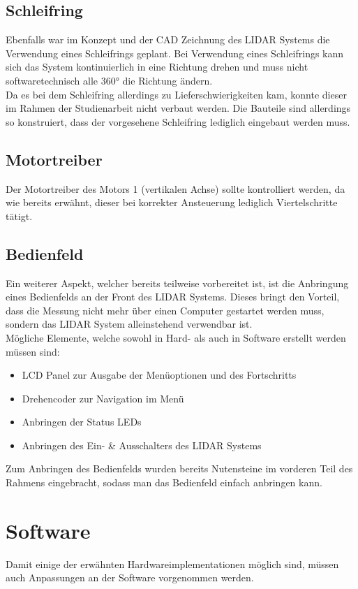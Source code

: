 \subsection{Schleifring}
Ebenfalls war im Konzept und der \ac{CAD} Zeichnung des \ac{LIDAR} Systems die Verwendung eines Schleifrings geplant. Bei Verwendung eines Schleifrings kann sich das System kontinuierlich in eine Richtung drehen und muss nicht softwaretechnisch alle 360° die Richtung ändern.\\
Da es bei dem Schleifring allerdings zu Lieferschwierigkeiten kam, konnte dieser im Rahmen der Studienarbeit nicht verbaut werden. Die Bauteile sind allerdings so konstruiert, dass der vorgesehene Schleifring lediglich eingebaut werden muss. 
\subsection{Motortreiber}
Der Motortreiber des Motors 1 (vertikalen Achse) sollte kontrolliert werden, da wie bereits erwähnt, dieser bei korrekter Ansteuerung lediglich Viertelschritte tätigt. 
\subsection{Bedienfeld}
Ein weiterer Aspekt, welcher bereits teilweise vorbereitet ist, ist die Anbringung eines Bedienfelds an der Front des \ac{LIDAR} Systems. Dieses bringt den Vorteil, dass die Messung nicht mehr über einen Computer gestartet werden muss, sondern das \ac{LIDAR} System alleinstehend verwendbar ist.\\
Mögliche Elemente, welche sowohl in Hard- als auch in Software erstellt werden müssen sind:
\begin{itemize}
	\item LCD Panel zur Ausgabe der Menüoptionen und des Fortschritts
	\item Drehencoder zur Navigation im Menü
	\item Anbringen der Status \acp{LED}
	\item Anbringen des Ein- \& Ausschalters des \ac{LIDAR} Systems
\end{itemize}
Zum Anbringen des Bedienfelds wurden bereits Nutensteine im vorderen Teil des Rahmens eingebracht, sodass man das Bedienfeld einfach anbringen kann.

\section{Software}
Damit einige der erwähnten Hardwareimplementationen möglich sind, müssen auch Anpassungen an der Software vorgenommen werden.
